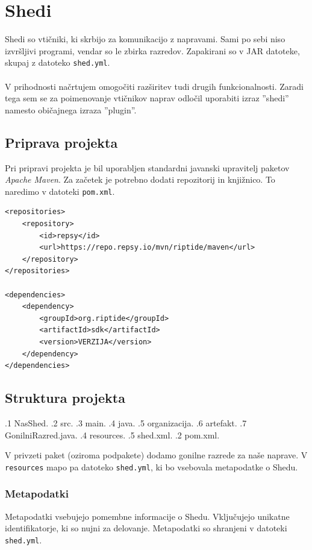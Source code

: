 \documentclass[12pt]{article}
\begin{document}
\section{Shedi}
Shedi so vtičniki, ki skrbijo za komunikacijo z napravami. Sami po sebi
niso izvršljivi programi, vendar so le zbirka razredov. Zapakirani so v
JAR datoteke, skupaj z datoteko \texttt{shed.yml}.
\\\\
V prihodnosti načrtujem omogočiti razširitev tudi drugih funkcionalnosti.
Zaradi tega sem se za poimenovanje vtičnikov naprav odločil uporabiti
izraz ''shedi'' namesto običajnega izraza ''plugin''.

\subsection{Priprava projekta}
Pri pripravi projekta je bil uporabljen standardni javanski upravitelj
paketov \textit{Apache Maven}. Za začetek je potrebno dodati repozitorij in
knjižnico. To naredimo v datoteki \texttt{pom.xml}.

\begin{lstlisting}[style=XmlStyle]
<repositories>
	<repository>
		<id>repsy</id>
		<url>https://repo.repsy.io/mvn/riptide/maven</url>
	</repository>
</repositories>

<dependencies>
	<dependency>
		<groupId>org.riptide</groupId>
		<artifactId>sdk</artifactId>
		<version>VERZIJA</version>
	</dependency>
</dependencies>
\end{lstlisting}
\newpage

\subsection{Struktura projekta} \label{struktura-projekta}
\begin{dirtree}{%
.1 NasShed.
	.2 src.
		.3 main.
			.4 java.
				.5 organizacija.
					.6 artefakt.
						.7 GonilniRazred.java.
			.4 resources.
				.5 shed.xml.
	.2 pom.xml.
}
\end{dirtree}
\vspace*{12pt}
V privzeti paket (oziroma podpakete) dodamo gonilne razrede za naše naprave.
V \texttt{resources} mapo pa datoteko \texttt{shed.yml}, ki bo vsebovala
metapodatke o Shedu.

\subsubsection{Metapodatki}
Metapodatki vsebujejo pomembne informacije o Shedu. Vključujejo unikatne
identifikatorje, ki so nujni za delovanje. Metapodatki so shranjeni v
datoteki \texttt{shed.yml}.
\end{document}
